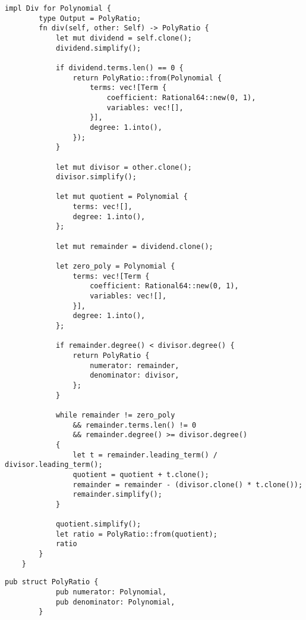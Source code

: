 \begin{lstlisting}[caption={The implementation of the division operation for the \texttt{Polynomial} struct}, label={lst:polynomial-div}]
    impl Div for Polynomial {
        type Output = PolyRatio;
        fn div(self, other: Self) -> PolyRatio {
            let mut dividend = self.clone();
            dividend.simplify();
    
            if dividend.terms.len() == 0 {
                return PolyRatio::from(Polynomial {
                    terms: vec![Term {
                        coefficient: Rational64::new(0, 1),
                        variables: vec![],
                    }],
                    degree: 1.into(),
                });
            }
    
            let mut divisor = other.clone();
            divisor.simplify();
    
            let mut quotient = Polynomial {
                terms: vec![],
                degree: 1.into(),
            };
    
            let mut remainder = dividend.clone();
    
            let zero_poly = Polynomial {
                terms: vec![Term {
                    coefficient: Rational64::new(0, 1),
                    variables: vec![],
                }],
                degree: 1.into(),
            };
    
            if remainder.degree() < divisor.degree() {
                return PolyRatio {
                    numerator: remainder,
                    denominator: divisor,
                };
            }
    
            while remainder != zero_poly
                && remainder.terms.len() != 0
                && remainder.degree() >= divisor.degree()
            {
                let t = remainder.leading_term() / divisor.leading_term();
                quotient = quotient + t.clone();
                remainder = remainder - (divisor.clone() * t.clone());
                remainder.simplify();
            }
    
            quotient.simplify();
            let ratio = PolyRatio::from(quotient);
            ratio
        }
    }
\end{lstlisting}

\begin{minipage}{\linewidth}
    \begin{lstlisting}[caption={The \texttt{PolyRatio} struct}, label={lst:polyratio}]
        pub struct PolyRatio {
            pub numerator: Polynomial,
            pub denominator: Polynomial,
        }
    \end{lstlisting}
\end{minipage}

